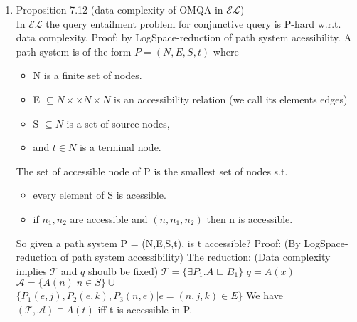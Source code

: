 \documentclass[11pt]{article}
\begin{document}
\begin{enumerate}
\begin{enumerate}
\item Proposition 7.12  (data complexity of OMQA in $\mathcal{E}\mathcal{L}$) \\
\label{sec-1-2-2-2-3}
In $\mathcal{E}\mathcal{L}$ the query entailment problem for 
conjunctive query is P-hard w.r.t. data complexity.      
Proof: by LogSpace-reduction of path system acessibility.
A path system is of the form $P= (N,E,S,t)$ where
\begin{itemize}
\item N is a finite set of nodes. 
\item E $\subseteq N \times \times N \times N$ is an 
accessibility relation (we call its elements edges)
\item S $\subseteq N$ is a set of source nodes,
\item and $t \in N$ is a terminal node.
\end{itemize}

The set of accessible node of P is the smallest set of nodes s.t.
\begin{itemize}
\item every element of S is acessible.
\item if $n_{1}, n_{2}$ are accessible and $(n,n_{1}, n_{2})$ then n 
is accessible.\\
\end{itemize}
So given a path system P = (N,E,S,t), is t accessible?
Proof: (By LogSpace-reduction of path system accessibility)
The reduction:
(Data complexity implies $\mathcal{T}$ and $q$ shoulb be fixed)
$\mathcal{T} = \{\exists P_{1}. A \sqsubseteq B_{1}\}$
$q = A(x)$
$\mathcal{A} = \{ A(n)| n \in S\} \cup$ \\
      $\{P_{1}(e,j), P_{2}(e,k), P_{3}(n,e) | e=(n,j,k) \in E\}$
We have $(\mathcal{T},\mathcal{A}) \models A(t)$ 
iff t is accessible in P.
\end{enumerate}
\end{enumerate}
\end{document}
